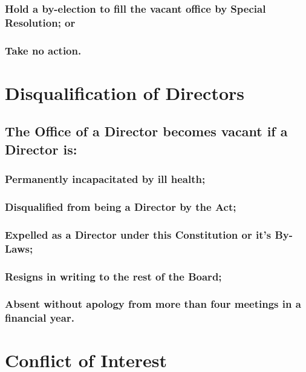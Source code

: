\documentclass{article}
\newenvironment{subs}
  {\adjustwidth{2em}{0pt}}
  {\endadjustwidth}
\begin{document}
\begin{subs}
\begin{subs}
\begin{subs}
\begin{subs}
\subsubsection{Hold a by-election to fill the vacant office by Special Resolution; or}
\subsubsection{Take no action.}
\end{subs}
\end{subs}
\newpage

\section{Disqualification of Directors}
\begin{subs}
\subsection{The Office of a Director becomes vacant if a Director is:}
\begin{subs}
\subsubsection{Permanently incapacitated by ill health;}
\subsubsection{Disqualified from being a Director by the Act;}
\subsubsection{Expelled as a Director under this Constitution or it's By-Laws;}
\subsubsection{Resigns in writing to the rest of the Board;}
\subsubsection{Absent without apology from more than four meetings in a financial year.}
\end{subs}
\end{subs}

\section{Conflict of Interest}
\begin{subs}

\end{subs}
\end{subs}
\end{subs}
\end{document}
